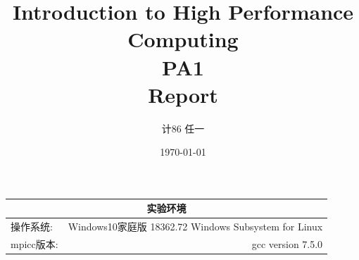 \documentclass[UTF8]{article}
\title{\textbf{Introduction to High Performance Computing} \\ \textbf{PA1} \\ \textbf{Report}} %
\author{计86 \quad 任一\quad 2018011423} %
\date{\today} %
\begin{document}
\maketitle %





\begin{center}
    \begin{tabular}{l  r}
    \hline

        \multicolumn{2}{c}{实验环境} \\ \hline
        操作系统: & Windows10家庭版 18362.72 Windows Subsystem for Linux \\ \hline%
        mpicc版本: & gcc version 7.5.0 \\ \hline%


    \end{tabular}
\end{center}

\end{document}
